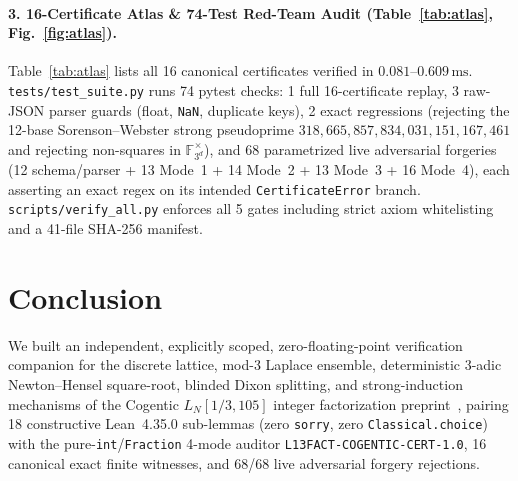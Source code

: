 \documentclass[10pt,twocolumn]{article}
\newcommand{\FF}{\mathbb{F}}
\begin{document}
\paragraph{3. 16-Certificate Atlas \& 74-Test Red-Team Audit (Table~\ref{tab:atlas}, Fig.~\ref{fig:atlas}).}
Table~\ref{tab:atlas} lists all 16 canonical certificates verified in $0.081$--$0.609\,\mathrm{ms}$. \texttt{tests/test\_\allowbreak suite.py} runs 74 pytest checks: 1 full 16-certificate replay, 3 raw-JSON parser guards (float, \texttt{NaN}, duplicate keys), 2 exact regressions (rejecting the 12-base Sorenson--Webster strong pseudoprime $318{,}665{,}857{,}834{,}031{,}151{,}167{,}461$ and rejecting non-squares in $\FF_{3^d}^\times$), and 68 parametrized live adversarial forgeries (12 schema/parser + 13 Mode~1 + 14 Mode~2 + 13 Mode~3 + 16 Mode~4), each asserting an exact regex on its intended \texttt{CertificateError} branch. \texttt{scripts/verify\_\allowbreak all.py} enforces all 5 gates including strict axiom whitelisting and a 41-file SHA-256 manifest.

\section{Conclusion}\label{sec:conc}
We built an independent, explicitly scoped, zero-floating-point verification companion for the discrete lattice, mod-3 Laplace ensemble, deterministic 3-adic Newton--Hensel square-root, blinded Dixon splitting, and strong-induction mechanisms of the Cogentic $L_N[1/3, 105]$ integer factorization preprint~\cite{cogentic2026l13factoring,cai2026cogentic}, pairing 18 constructive Lean~4.35.0 sub-lemmas (zero \texttt{sorry}, zero \texttt{Classical.choice}) with the pure-\texttt{int}/\texttt{Fraction} 4-mode auditor \texttt{L13FACT-\allowbreak COGENTIC-\allowbreak CERT-1.0}, 16 canonical exact finite witnesses, and 68/68 live adversarial forgery rejections.

{\footnotesize

}
\end{document}
